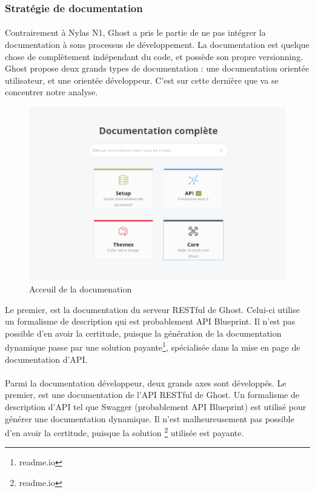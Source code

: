    \subsubsection{Stratégie de documentation}
        \paragraph{}
            Contrairement à Nylas N1, Ghost a pris le partie de ne pas intégrer la documentation à sons processus
            de développement. La documentation est quelque chose de complètement indépendant du code,
            et possède son propre versionning. Ghost propose deux grands types de documentation : une documentation
            orientée utilisateur, et une orientée développeur. C'est sur cette dernière que va se concentrer
            notre analyse.

        \begin{figure}[h]
            \centering
            \includegraphics[scale=0.35]{./assets/ghost1.png}
            \caption{Acceuil de la documenation}
        \end{figure}

        Le premier, est la documentation du serveur RESTful de Ghost. Celui-ci utilise un formalisme
        de description qui est probablement API Blueprint. Il n'est pas possible d'en avoir la certitude,
        puisque la génération de la documentation dynamique passe par une solution payante\footnote{readme.io},
        spécialisée dans la mise en page de documentation d'API.\\

        \newpage
        \paragraph{}
            Parmi la documentation développeur, deux grands axes sont développés.
            Le premier, est une documentation de l'API RESTful de Ghost. Un formalisme de description
            d'API tel que Swagger (probablement API Blueprint) est utilisé pour générer une documentation
            dynamique. Il n'est malheureusement pas possible d'en avoir la certitude, puisque la solution
            \footnote{readme.io} utilisée est payante.

